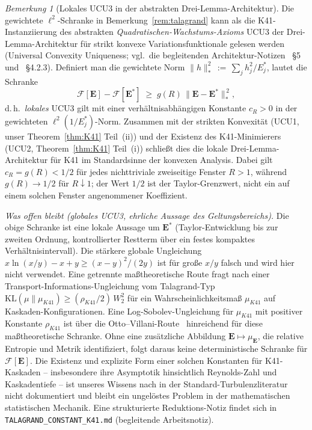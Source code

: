 \documentclass[12pt,a4paper]{article}
\theoremstyle{definition}
\theoremstyle{plain}
\theoremstyle{remark}
\newtheorem{remark}[definition]{Bemerkung}
\begin{document}
\begin{remark}[Lokales UCU3 in der abstrakten Drei-Lemma-Architektur]
\label{rem:local-ucu3}
Die gewichtete $\ell^2$-Schranke in Bemerkung~\ref{rem:talagrand} kann als
die K41-Instanziierung des abstrakten \emph{Quadratischen-Wachstums-Axioms}
\textnormal{UCU3} der Drei-Lemma-Architektur für strikt konvexe
Variationsfunktionale gelesen werden (Universal Convexity Uniqueness; vgl.\ die
begleitenden Architektur-Notizen ~\S5
und ~\S4.2.3). Definiert man die
gewichtete Norm $\|h\|^2_*\,:=\,\sum_j h_j^2/E_j^*$, lautet die Schranke
\[
  \mathcal{F}[\mathbf{E}] - \mathcal{F}[\mathbf{E}^*]
  \;\ge\;
  g(R)\,\|\mathbf{E}-\mathbf{E}^*\|_*^{\,2},
\]
d.\,h.\ \emph{lokales} UCU3 gilt mit einer verhältnisabhängigen Konstante
$c_R>0$ in der gewichteten
$\ell^2(1/E_j^*)$-Norm. Zusammen mit der strikten Konvexität (UCU1, unser
Theorem~\ref{thm:K41} Teil~(ii)) und der Existenz des K41-Minimierers
(UCU2, Theorem~\ref{thm:K41} Teil~(i)) schließt dies die lokale
Drei-Lemma-Architektur für K41 im Standardsinne der konvexen
Analysis. Dabei gilt $c_R=g(R)<1/2$ für jedes nichttriviale zweiseitige
Fenster $R>1$, während $g(R)\to1/2$ für $R\downarrow1$; der Wert $1/2$
ist der Taylor-Grenzwert, nicht ein auf einem solchen Fenster angenommener
Koeffizient.

\smallskip\noindent\textit{Was offen bleibt (globales UCU3, ehrliche Aussage des Geltungsbereichs).} Die obige Schranke ist eine lokale Aussage um $\mathbf{E}^*$
(Taylor-Entwicklung bis zur zweiten Ordnung, kontrollierter Restterm über
ein festes kompaktes Verhältnisintervall). Die stärkere globale Ungleichung
$x\ln(x/y)-x+y\ge (x-y)^2/(2y)$ ist für große $x/y$ falsch und wird hier
nicht verwendet. Eine getrennte maßtheoretische Route fragt nach einer
Transport-Informations-Ungleichung vom Talagrand-Typ
$\mathrm{KL}(\mu\|\mu_{K41}) \ge (\rho_{K41}/2)\,W_2^2$ für ein
Wahrscheinlichkeitsmaß $\mu_{K41}$ auf Kaskaden-Konfigurationen. Eine
Log-Sobolev-Ungleichung für $\mu_{K41}$ mit positiver Konstante
$\rho_{K41}$ ist über die Otto--Villani-Route~\cite{OttoVillani2000}
hinreichend für diese maßtheoretische Schranke. Ohne eine zusätzliche
Abbildung $\mathbf E\mapsto\mu_{\mathbf E}$, die relative Entropie und
Metrik identifiziert, folgt daraus keine deterministische Schranke für
$\mathcal F[\mathbf E]$. Die Existenz und
explizite Form einer solchen Konstanten für K41-Kaskaden -- insbesondere ihre
Asymptotik hinsichtlich Reynolds-Zahl und Kaskadentiefe -- ist unseres Wissens nach
in der Standard-Turbulenzliteratur nicht dokumentiert und bleibt ein ungelöstes
Problem in der mathematischen statistischen Mechanik. Eine strukturierte Reduktions-Notiz
findet sich in \texttt{TALAGRAND\_CONSTANT\_K41.md} (begleitende
Arbeitsnotiz).
\end{remark}
\end{document}
